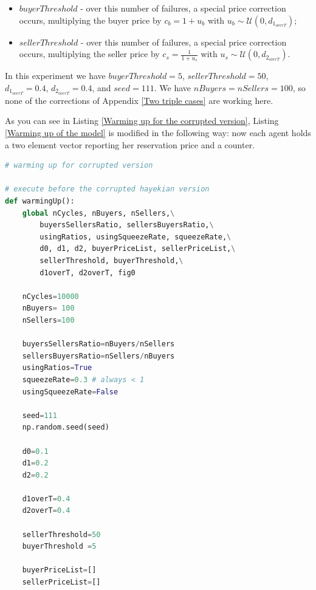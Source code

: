 \documentclass[10pt]{report}
\begin{document}
\begin{appendices}
\begin{itemize}

\item $buyerThreshold$ - over this number of failures, a special price correction occurs, multiplying the buyer price by $c_b=1 + u_b$ with $u_b\sim\mathcal{U}(0,d_{1_{overT}})$;

\item $sellerThreshold$ - over this number of failures, a special price correction occurs, multiplying the seller price by $c_s=\frac{1} {1 + u_s}$ with $u_s\sim\mathcal{U}(0,d_{2_{overT}})$.

\end{itemize}

In this experiment we have $buyerThreshold=5$,  $sellerThreshold=50$, $d_{1_{overT}}=0.4$, $d_{2_{overT}}=0.4$, and $seed=111$. We have $nBuyers=nSellers=100$, so none of the corrections of Appendix \ref{Two triple cases} are working here.

As you can see in Listing \ref{Warming up for the corrupted version}, Listing \ref{Warming up of the model} is modified in the following way: now each agent holds a two element vector reporting her reservation price and a counter.


\begin{lstlisting}[language=Python, caption=Warming up for the corrupted version of the model, 
label={Warming up for the corrupted version},basicstyle=\ttfamily\footnotesize]
# warming up for corrupted version

# execute before the corrupted hayekian version
def warmingUp():
    global nCycles, nBuyers, nSellers,\
        buyersSellersRatio, sellersBuyersRatio,\
        usingRatios, usingSqueezeRate, squeezeRate,\
        d0, d1, d2, buyerPriceList, sellerPriceList,\
        sellerThreshold, buyerThreshold,\
        d1overT, d2overT, fig0

    nCycles=10000
    nBuyers= 100
    nSellers=100

    buyersSellersRatio=nBuyers/nSellers
    sellersBuyersRatio=nSellers/nBuyers
    usingRatios=True
    squeezeRate=0.3 # always < 1 
    usingSqueezeRate=False

    seed=111
    np.random.seed(seed)

    d0=0.1
    d1=0.2
    d2=0.2
    
    d1overT=0.4
    d2overT=0.4

    sellerThreshold=50
    buyerThreshold =5

    buyerPriceList=[]
    sellerPriceList=[]


\end{lstlisting}
\end{appendices}
\end{document}
